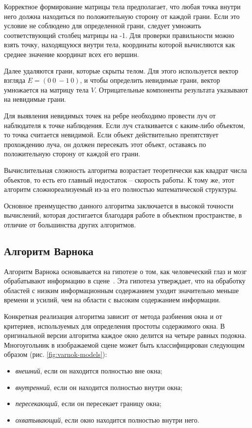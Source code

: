 Корректное формирование матрицы тела предполагает, что любая точка внутри него должна находиться по положительную сторону от каждой грани. Если это условие не соблюдено для определенной грани, следует умножить соответствующий столбец матрицы на -1. Для проверки правильности можно взять точку, находящуюся внутри тела, координаты которой вычисляются как среднее значение координат всех его вершин.

Далее удаляются грани, которые скрыты телом. Для этого используется вектор взгляда $E = (0 \ 0 \ -1 \ 0)$, и чтобы определить невидимые грани, вектор умножается на матрицу тела $V$. Отрицательные компоненты результата указывают на невидимые грани.

Для выявления невидимых точек на ребре необходимо провести луч от наблюдателя к точке наблюдения. Если луч сталкивается с каким-либо объектом, то точка считается невидимой. Если объект действительно препятствует прохождению луча, он должен пересекать этот объект, оставаясь по положительную сторону от каждой его грани.

Вычислительная сложность алгоритма возрастает теоретически как квадрат числа объектов, то есть его главный недостаток -- скорость работы. К тому же, этот алгоритм сложнореализуемый из-за его полностью математической структуры.

Основное преимущество данного алгоритма заключается в высокой точности вычислений, которая достигается благодаря работе в объектном пространстве, в отличие от большинства других алгоритмов.

\subsection{Алгоритм Варнока}

Алгоритм Варнока основывается на гипотезе о том, как человеческий глаз и мозг обрабатывают информацию в сцене~\cite{lit3, lit4}. Эта гипотеза утверждает, что на обработку областей с низким информационным содержанием уходит значительно меньше времени и усилий, чем на области с высоким содержанием информации.

Конкретная реализация алгоритма зависит от метода разбиения окна и от критериев, используемых для определения простоты содержимого окна. В оригинальной версии алгоритма каждое окно делится на четыре равных подокна. Многоугольник в изображаемой сцене может быть классифицирован следующим образом (рис. \ref{fig:varnok-models}):
\begin{itemize}[label=--]
	\item \textit{внешний}, если он находится полностью вне окна;
	\item \textit{внутренний}, если он находится полностью внутри окна;
	\item \textit{пересекающий}, если он пересекает границу окна;
	\item \textit{охватывающий}, если окно находится полностью внутри него.
\end{itemize}

